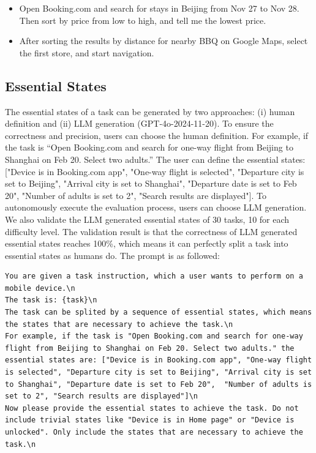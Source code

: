\documentclass[11pt]{article}
\begin{document}
\begin{itemize}[leftmargin=5mm]
    \item Open Booking.com and search for stays in Beijing from Nov 27 to Nov 28. Then sort by price from low to high, and tell me the lowest price.
    \item After sorting the results by distance for nearby BBQ on Google Maps, select the first store, and start navigation.
\end{itemize}

\subsection{Essential States}
\label{app:essential-states}

The essential states of a task can be generated by two approaches: (i) human definition and (ii) LLM generation (GPT-4o-2024-11-20). To ensure the correctness and precision, users can choose the human definition. For example, if the task is ``Open Booking.com and search for one-way flight from Beijing to Shanghai on Feb 20. Select two adults.'' The user can define the essential states: ["Device is in Booking.com app", "One-way flight is selected", "Departure city is set to Beijing", "Arrival city is set to Shanghai", "Departure date is set to Feb 20",  "Number of adults is set to 2", "Search results are displayed"]. To autonomously execute the evaluation process, users can choose LLM generation.  We also validate the LLM generated essential states of 30 tasks, 10 for each difficulty level. The validation result is that the correctness of LLM generated essential states reaches 100\%, which means it can perfectly split a task into essential states as humans do. The prompt is as followed:

\begin{lstlisting}[style=prompt, caption={Prompt for essential states generation.}]
You are given a task instruction, which a user wants to perform on a mobile device.\n
The task is: {task}\n
The task can be splited by a sequence of essential states, which means the states that are necessary to achieve the task.\n
For example, if the task is "Open Booking.com and search for one-way flight from Beijing to Shanghai on Feb 20. Select two adults." the essential states are: ["Device is in Booking.com app", "One-way flight is selected", "Departure city is set to Beijing", "Arrival city is set to Shanghai", "Departure date is set to Feb 20",  "Number of adults is set to 2", "Search results are displayed"]\n
Now please provide the essential states to achieve the task. Do not include trivial states like "Device is in Home page" or "Device is unlocked". Only include the states that are necessary to achieve the task.\n
\end{lstlisting}
\end{document}
